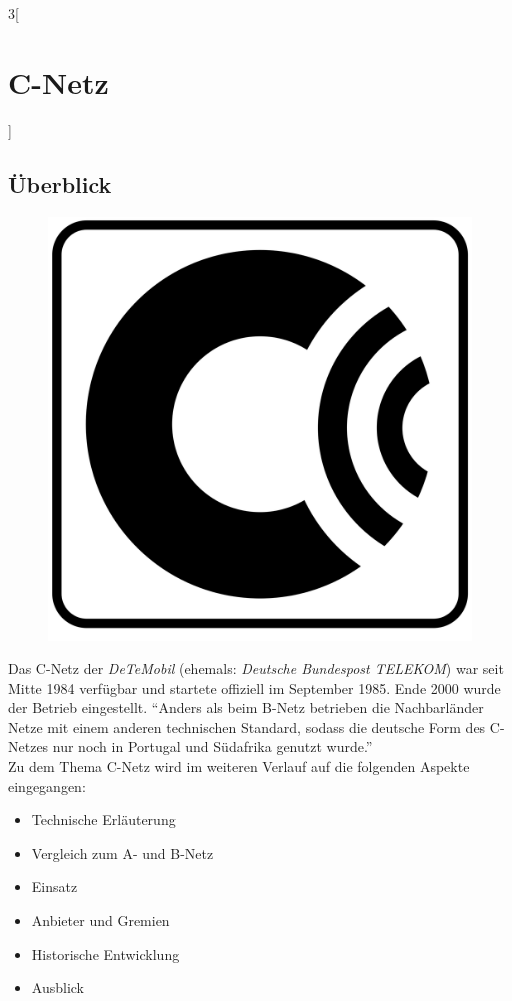 \begin{multicols}{3}[\section{C-Netz}]
\subsection*{Überblick}
\begin{figure}
  \vspace{-20pt}
  \begin{center}
  	\hspace{-20pt}
    \includegraphics[width=0.7\linewidth]{Kapitel/C-Netz/Grafiken/C-Netz_Logo.png}
  \end{center}
  \vspace{-15pt}
\end{figure}
Das C-Netz der \textit{DeTeMobil} (ehemals: \textit{Deutsche Bundespost TELEKOM}) war seit Mitte 1984 verfügbar und startete offiziell im September 1985. Ende 2000 wurde der Betrieb eingestellt. \enquote{Anders als beim B-Netz betrieben die Nachbarländer Netze mit einem anderen technischen Standard, sodass die deutsche Form des C-Netzes nur noch in Portugal und Südafrika genutzt wurde.}~\cite{c-netz.1}\\
Zu dem Thema C-Netz wird im weiteren Verlauf auf die folgenden Aspekte eingegangen:
\begin{itemize}
	\item Technische Erläuterung
	\item Vergleich zum A- und B-Netz 
	\item Einsatz		
	\item Anbieter und Gremien
	\item Historische Entwicklung
	\item Ausblick
\end{itemize}




\end{multicols}
